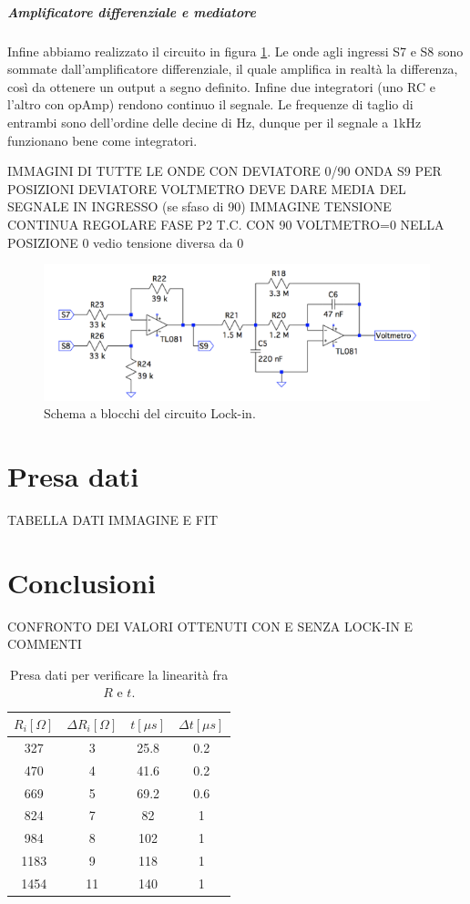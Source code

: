 \documentclass[10pt,a4paper]{article}
\begin{document}
\subparagraph{Amplificatore differenziale e mediatore}
Infine abbiamo realizzato il circuito in figura \ref{fig:amplificatorediff-mediatore}. Le onde agli ingressi S7 e S8 sono sommate dall'amplificatore differenziale, il quale amplifica in realtà la differenza, così da ottenere un output a segno definito. Infine due integratori (uno RC e l'altro con opAmp) rendono continuo il segnale. Le frequenze di taglio di entrambi sono dell'ordine delle decine di Hz, dunque per il segnale a $1$kHz funzionano bene come integratori.

IMMAGINI DI TUTTE LE ONDE CON DEVIATORE 0/90
ONDA S9 PER POSIZIONI DEVIATORE%
VOLTMETRO DEVE DARE MEDIA DEL SEGNALE IN INGRESSO (se sfaso di 90)
IMMAGINE TENSIONE CONTINUA
REGOLARE FASE P2 T.C. CON 90 VOLTMETRO=0 %
NELLA POSIZIONE 0 vedio tensione diversa da 0

\begin{figure}[!htb]
  \centering
  \includegraphics[scale=0.75]{amplificatorediff-mediatore.png}
\caption{Schema a blocchi del circuito Lock-in.\label{fig:amplificatorediff-mediatore}}
\end{figure}

\section{Presa dati}

TABELLA DATI
IMMAGINE E FIT




\section{Conclusioni}

CONFRONTO DEI VALORI OTTENUTI CON E SENZA LOCK-IN E COMMENTI


\begin{table}[!htb]
\centering
\begin{tabular}{|c|c|c|c|}
\hline 
$R_i [\Omega ]$ & $\Delta R_i [\Omega ]$ & $t [\mu s]$ & $\Delta t [\mu s]$\\
\hline
 327 &  3 & 25.8 & 0.2\\ 
\hline 
 470 &  4 & 41.6 & 0.2\\ 
\hline
 669 &  5 & 69.2 & 0.6\\ 
\hline
 824 &  7 & 82 & 1\\ 
\hline 
 984 &  8 & 102 & 1\\ 
\hline
 1183 &  9 & 118 & 1\\ 
\hline
 1454 &  11 & 140 & 1\\ 
\hline
\end{tabular} 
\caption{Presa dati per verificare la linearità fra $R$ e $t$.\label{tab:monostabile}}
\end{table}
\end{document}
